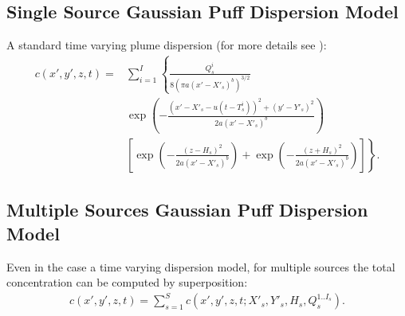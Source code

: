 \documentclass{article}
\begin{document}
\subsection{Single Source Gaussian Puff Dispersion Model}

A standard time varying plume dispersion (for more details see \cite{stockie2011}):
\begin{align}\label{eqn:singlesourcesgaussianpuffdispersion}
c(x',y',z,t) = & \sum_{i=1}^I \left\{ \frac{Q^i_s}{8(\pi a (x'-X'_s)^b)^{3/2}} \right. \nonumber \\
& \exp\left(-\frac{(x'-X'_s-u(t-T^i_s))^2+(y'-Y'_s)^2}{2 a (x'-X'_s)^b}\right) \nonumber \\
& \left. \left[\exp\left(-\frac{(z-H_s)^2}{2 a (x'-X'_s)^b}\right) + \exp\left(-\frac{(z+H_s)^2}{2 a (x'-X'_s)^b}\right)\right]\right\}.
\end{align}

\subsection{Multiple Sources Gaussian Puff Dispersion Model}

Even in the case a time varying dispersion model, for multiple sources the total concentration can be computed by superposition:
\begin{align}\label{eqn:multiplesourcesgaussianpuffdispersion}
c(x',y',z,t) = \sum_{s=1}^S c(x',y',z,t;X'_s,Y'_s,H_s,Q^{1..I_s}_s).
\end{align}
\end{document}
